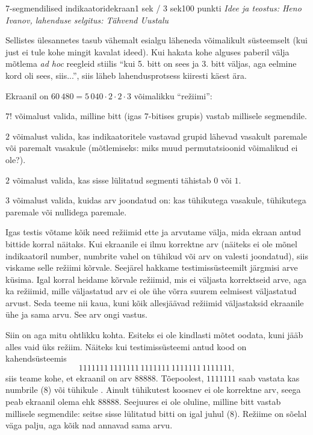 \begin{yl}{6}{7-segmendilised indikaatorid}{ekraan}{1 sek / 3 sek}{100 punkti}
  \emph{Idee ja teostus: Heno Ivanov, lahenduse selgitus: Tähvend Uustalu}

  Sellistes ülesannetes tasub vähemalt esialgu läheneda võimalikult süsteemselt
  (kui just ei tule kohe mingit kavalat ideed).
  Kui hakata kohe alguses paberil välja mõtlema \textit{ad hoc} reegleid stiilis
  ``kui 5. bitt on sees ja 3. bitt väljas, aga eelmine kord oli sees, siis...'',
  siis läheb lahendusprotsess kiiresti käest ära.

  Ekraanil on $60\,480 = 5\,040 \cdot 2 \cdot 2 \cdot 3$ võimalikku ``režiimi'':
  \begin{xitem}
  \item $7!$ võimalust valida, milline bitt (igas $7$-bitises grupis) vastab millisele segmendile.
  \item $2$ võimalust valida, kas indikaatoritele vastavad grupid lähevad
    vasakult paremale või paremalt vasakule (mõtlemiseks: miks muud permutatsioonid võimalikud ei ole?).
  \item $2$ võimalust valida, kas sisse lülitatud segmenti tähistab $0$ või $1$.
  \item $3$ võimalust valida, kuidas arv joondatud on: kas tühikutega vasakule,
    tühikutega paremale või nullidega paremale.
  \end{xitem}

  Igas testis võtame kõik need režiimid ette ja arvutame välja, mida ekraan
  antud bittide korral näitaks. Kui ekraanile ei ilmu korrektne arv
  (näiteks ei ole mõnel indikaatoril number, numbrite vahel on tühikud
  või arv on valesti joondatud), siis viskame selle režiimi kõrvale.
  Seejärel hakkame testimissüsteemilt järgmisi arve küsima. Igal korral
  heidame kõrvale režiimid, mis ei väljasta korrektseid arve, aga ka režiimid,
  mille väljastatud arv ei ole ühe võrra suurem eelmisest väljastatud arvust.
  Seda teeme nii kaua, kuni kõik allesjäävad režiimid väljastaksid ekraanile
  ühe ja sama arvu. See arv ongi vastus.

  Siin on aga mitu ohtlikku kohta. Esiteks ei ole kindlasti mõtet oodata, kuni jääb
  alles vaid üks režiim. Näiteks kui testimissüsteemi antud kood on kahendsüsteemis
  \[ 1111111 \, 1111111 \, 1111111 \, 1111111 \, 1111111, \]
  siis teame kohe, et ekraanil on arv 88888. Tõepoolest, $1111111$ saab vastata
  kas numbrile  (8) või tühikule . Ainult tühikutest koosnev
   ei ole
  korrektne arv, seega peab ekraanil olema 
  ehk 88888. Seejuures ei ole oluline, milline bitt vastab millisele segmendile:
  seitse sisse lülitatud bitti on igal juhul  (8). Režiime on sõelal väga
  palju, aga kõik nad annavad sama arvu.


\end{yl}
